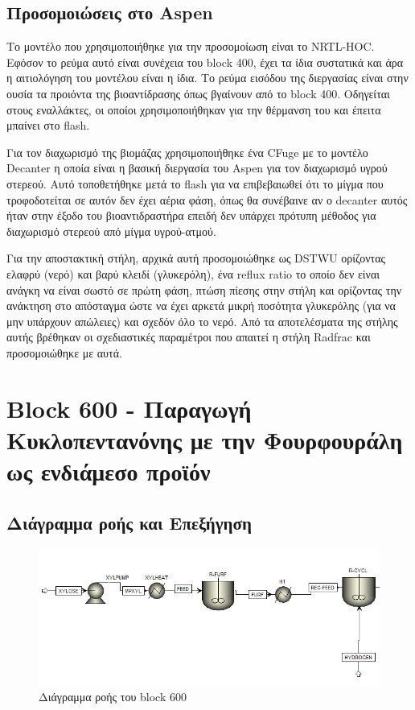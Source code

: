 \documentclass[11pt]{article}
\begin{document}
\subsection{Προσομοιώσεις στο Aspen}
\label{sec:org40cfaa6}
Το μοντέλο που χρησιμοποιήθηκε για την προσομοίωση είναι το NRTL-HOC. Εφόσον το ρεύμα αυτό είναι συνέχεια του block 400, έχει τα ίδια συστατικά και άρα η αιτιολόγηση του μοντέλου είναι η ίδια. Το ρεύμα εισόδου της διεργασίας είναι στην ουσία τα προιόντα της βιοαντίδρασης όπως βγαίνουν από το block 400. Οδηγείται στους εναλλάκτες, οι οποίοι χρησιμοποιήθηκαν για την θέρμανση του και έπειτα μπαίνει στο flash.

Για τον διαχωρισμό της βιομάζας χρησιμοποιήθηκε ένα CFuge με το μοντέλο Decanter η οποία είναι η βασική διεργασία του Aspen για τον διαχωρισμό υγρού στερεού. Αυτό τοποθετήθηκε μετά το flash για να επιβεβαιωθεί ότι το μίγμα που τροφοδοτείται σε αυτόν δεν έχει αέρια φάση, όπως θα συνέβαινε αν ο decanter αυτός ήταν στην έξοδο του βιοαντιδραστήρα επειδή δεν υπάρχει πρότυπη μέθοδος για διαχωρισμό στερεού από μίγμα υγρού-ατμού.

Για την αποστακτική στήλη, αρχικά αυτή προσομοιώθηκε ως DSTWU ορίζοντας ελαφρύ (νερό) και βαρύ κλειδί (γλυκερόλη), ένα reflux ratio το οποίο δεν είναι ανάγκη να είναι σωστό σε πρώτη φάση, πτώση πίεσης στην στήλη και ορίζοντας την ανάκτηση στο απόσταγμα ώστε να έχει αρκετά μικρή ποσότητα γλυκερόλης (για να μην υπάρχουν απώλειες) και σχεδόν όλο το νερό. Από τα αποτελέσματα της στήλης αυτής βρέθηκαν οι σχεδιαστικές παραμέτροι που απαιτεί η στήλη Radfrac και προσομοιώθηκε με αυτά.

\section{Block 600 - Παραγωγή Κυκλοπεντανόνης με την Φουρφουράλη ως ενδιάμεσο προϊόν}
\label{sec:orgaf411ea}

\subsection{Διάγραμμα ροής και Επεξήγηση}
\label{sec:orga385d8a}
\begin{figure}[htbp]
\centering
\includegraphics[width=.9\linewidth]{Block_600_-_Παραγωγή_Κυκλοπεντανόνης_με_την_Φουρφουράλη_ως_ενδιάμεσο_προϊόν/2023-01-13_17-51-52_screenshot.png}
\caption{Διάγραμμα ροής του block 600}
\end{figure}
\end{document}
